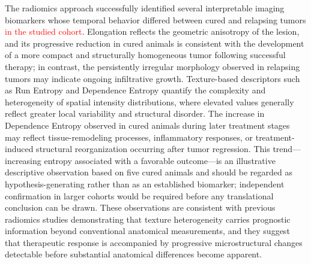 \documentclass{article}
\begin{document}
The radiomics approach successfully identified several interpretable imaging biomarkers whose temporal behavior differed between cured and relapsing tumors \textcolor{red}{in the studied cohort}. Elongation reflects the geometric anisotropy of the lesion, and its progressive reduction in cured animals is consistent with the development of a more compact and structurally homogeneous tumor following successful therapy; in contrast, the persistently irregular morphology observed in relapsing tumors may indicate ongoing infiltrative growth. Texture-based descriptors such as Run Entropy and Dependence Entropy quantify the complexity and heterogeneity of spatial intensity distributions, where elevated values generally reflect greater local variability and structural disorder. The increase in Dependence Entropy observed in cured animals during later treatment stages may reflect tissue-remodeling processes, inflammatory responses, or treatment-induced structural reorganization occurring after tumor regression. This trend---increasing entropy associated with a favorable outcome---is an illustrative descriptive observation based on five cured animals and should be regarded as hypothesis-generating rather than as an established biomarker; independent confirmation in larger cohorts would be required before any translational conclusion can be drawn. These observations are consistent with previous radiomics studies demonstrating that texture heterogeneity carries prognostic information beyond conventional anatomical measurements, and they suggest that therapeutic response is accompanied by progressive microstructural changes detectable before substantial anatomical differences become apparent.
\end{document}
